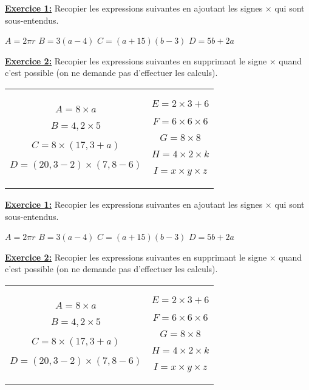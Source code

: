 \documentclass[12pt, twoside]{article}
\begin{document}
\bigskip

\bigskip

\ul{\textbf{Exercice 1:}} Recopier les expressions suivantes en ajoutant les
signes $\times$ qui sont sous-entendus.

\begin{center}
$A=2 \pi r$ \qquad $B=3(a-4)$ \qquad $C=(a+15)(b-3)$ \qquad $D=5b+2a$
\end{center}

\bigskip

\ul{\textbf{Exercice 2:}} Recopier les expressions suivantes en supprimant le
signe $\times$ quand c'est possible (on ne demande pas d'effectuer les calculs).


\begin{tabular}{cc}
\begin{minipage}{9cm}
$A=8 \times a$

$B=4,2 \times 5$

$C=8 \times (17,3 + a)$

$D=(20,3-2) \times (7,8 -6)$

\end{minipage}
&
\begin{minipage}{9cm}
$E=2 \times 3+6$

$F=6 \times 6 \times 6$

$G=8 \times 8$

$H=4 \times  2 \times k$

$I=x \times y \times z$

\end{minipage}
\end{tabular}

\bigskip

\bigskip

\ul{\textbf{Exercice 1:}} Recopier les expressions suivantes en ajoutant les
signes $\times$ qui sont sous-entendus.

\begin{center}
$A=2 \pi r$ \qquad $B=3(a-4)$ \qquad $C=(a+15)(b-3)$ \qquad $D=5b+2a$
\end{center}

\bigskip

\ul{\textbf{Exercice 2:}} Recopier les expressions suivantes en supprimant le
signe $\times$ quand c'est possible (on ne demande pas d'effectuer les calculs).


\begin{tabular}{cc}
\begin{minipage}{9cm}
$A=8 \times a$

$B=4,2 \times 5$

$C=8 \times (17,3 + a)$

$D=(20,3-2) \times (7,8 -6)$

\end{minipage}
&
\begin{minipage}{9cm}
$E=2 \times 3+6$

$F=6 \times 6 \times 6$

$G=8 \times 8$

$H=4 \times  2 \times k$

$I=x \times y \times z$

\end{minipage}
\end{tabular}
\end{document}
